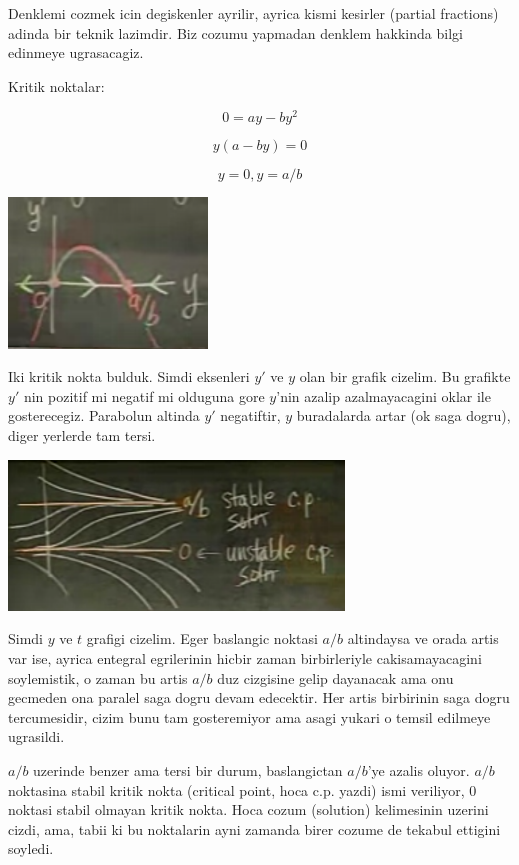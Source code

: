 \documentclass[12pt,fleqn]{article}\usepackage{../common}
\begin{document}
Denklemi cozmek icin degiskenler ayrilir, ayrica kismi kesirler (partial
fractions) adinda bir teknik lazimdir. Biz cozumu yapmadan denklem hakkinda
bilgi edinmeye ugrasacagiz. 

Kritik noktalar: 

\[ 0 = ay - by^2 \]

\[ y(a-by) = 0\]

\[ y = 0, y=a/b \]

\includegraphics[height=4cm]{5_7.png}

Iki kritik nokta bulduk. Simdi eksenleri $y'$ ve $y$ olan bir grafik
cizelim. Bu grafikte $y'$ nin pozitif mi negatif mi olduguna gore $y$'nin
azalip azalmayacagini oklar ile gosterecegiz. Parabolun altinda $y'$
negatiftir, $y$ buradalarda artar (ok saga dogru), diger yerlerde tam
tersi. 

\includegraphics[height=4cm]{5_8.png}

Simdi $y$ ve $t$ grafigi cizelim. Eger baslangic noktasi $a/b$ altindaysa
ve orada artis var ise, ayrica entegral egrilerinin hicbir zaman
birbirleriyle cakisamayacagini soylemistik, o zaman bu artis $a/b$ duz
cizgisine gelip dayanacak ama onu gecmeden ona paralel saga dogru devam
edecektir. Her artis birbirinin saga dogru tercumesidir, cizim bunu tam
gosteremiyor ama asagi yukari o temsil edilmeye ugrasildi.

$a/b$ uzerinde benzer ama tersi bir durum, baslangictan $a/b$'ye azalis
oluyor. $a/b$ noktasina stabil kritik nokta (critical point, hoca
c.p. yazdi) ismi veriliyor, $0$ noktasi stabil olmayan kritik nokta. Hoca
cozum (solution) kelimesinin uzerini cizdi, ama, tabii ki bu noktalarin
ayni zamanda birer cozume de tekabul ettigini soyledi.
\end{document}
